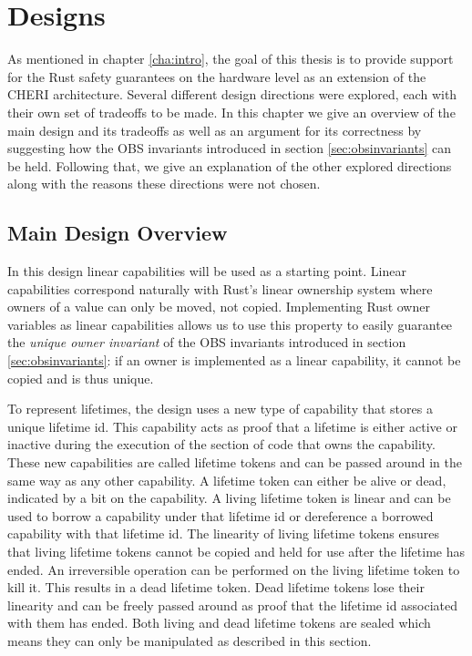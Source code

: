 \chapter{Designs}
As mentioned in chapter \ref{cha:intro}, the goal of this thesis is to provide support for the Rust safety guarantees on the hardware level as an extension of the CHERI architecture. Several different design directions were explored, each with their own set of tradeoffs to be made. In this chapter we give an overview of the main design and its tradeoffs as well as an argument for its correctness by suggesting how the OBS invariants introduced in section \ref{sec:obsinvariants} can be held. Following that, we give an explanation of the other explored directions along with the reasons these directions were not chosen.

\section{Main Design Overview}
\label{sec:maindesign}
In this design linear capabilities will be used as a starting point. Linear capabilities correspond naturally with Rust's linear ownership system where owners of a value can only be moved, not copied. Implementing Rust owner variables as linear capabilities allows us to use this property to easily guarantee the \textit{unique owner invariant} of the OBS invariants introduced in section \ref{sec:obsinvariants}: if an owner is implemented as a linear capability, it cannot be copied and is thus unique.

To represent lifetimes, the design uses a new type of capability that stores a unique lifetime id. This capability acts as proof that a lifetime is either active or inactive during the execution of the section of code that owns the capability. These new capabilities are called lifetime tokens and can be passed around in the same way as any other capability. A lifetime token can either be alive or dead, indicated by a bit on the capability. A living lifetime token is linear and can be used to borrow a capability under that lifetime id or dereference a borrowed capability with that lifetime id. The linearity of living lifetime tokens ensures that living lifetime tokens cannot be copied and held for use after the lifetime has ended. An irreversible operation can be performed on the living lifetime token to kill it. This results in a dead lifetime token. Dead lifetime tokens lose their linearity and can be freely passed around as proof that the lifetime id associated with them has ended. Both living and dead lifetime tokens are sealed which means they can only be manipulated as described in this section.

